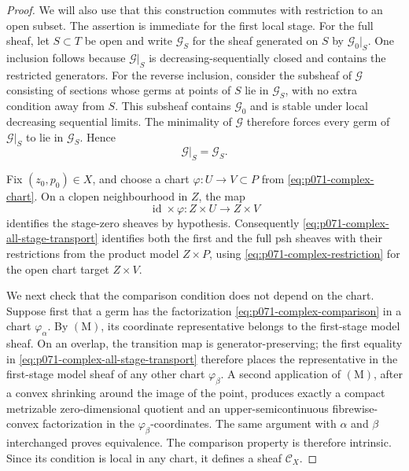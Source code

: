 \begin{proof}
We will also use that this construction commutes with restriction to an
open subset.  The assertion is immediate for the first local stage.  For
the full sheaf, let \(S\subset T\) be open and write \(\mathcal G_S\) for
the sheaf generated on \(S\) by \(\mathcal G_0|_S\).  One inclusion follows
because \(\mathcal G|_S\) is decreasing-sequentially closed and contains
the restricted generators.  For the reverse inclusion, consider the
subsheaf of \(\mathcal G\) consisting of sections whose germs at points of
\(S\) lie in \(\mathcal G_S\), with no extra condition away from \(S\).
This subsheaf contains \(\mathcal G_0\) and is stable under local decreasing
sequential limits.  The minimality of \(\mathcal G\) therefore forces every
germ of \(\mathcal G|_S\) to lie in \(\mathcal G_S\).  Hence
\begin{equation}
                    \mathcal G|_S=\mathcal G_S.
 \label{eq:p071-complex-restriction}
\end{equation}

Fix \((z_0,p_0)\in X\), and choose a chart
\(\varphi:U\to V\subset P\) from
\eqref{eq:p071-complex-chart}.  On a clopen neighbourhood in \(Z\), the map
\begin{equation}
               \operatorname{id}\times\varphi:
               Z\times U\longrightarrow Z\times V
 \label{eq:p071-complex-product-chart}
\end{equation}
identifies the stage-zero sheaves by hypothesis.  Consequently
\eqref{eq:p071-complex-all-stage-transport} identifies both the first and
the full psh sheaves with their restrictions from the product model
\(Z\times P\), using \eqref{eq:p071-complex-restriction} for the open chart
target \(Z\times V\).

We next check that the comparison condition does not depend on the chart.
Suppose first that a germ has the factorization
\eqref{eq:p071-complex-comparison} in a chart \(\varphi_\alpha\).  By
\((\mathrm M)\), its coordinate representative belongs to the first-stage
model sheaf.  On an overlap, the transition map is generator-preserving;
the first equality in \eqref{eq:p071-complex-all-stage-transport} therefore
places the representative in the first-stage model sheaf of any other
chart \(\varphi_\beta\).  A second application of \((\mathrm M)\), after a
convex shrinking around the image of the point, produces exactly a compact
metrizable zero-dimensional quotient and an upper-semicontinuous
fibrewise-convex factorization in the \(\varphi_\beta\)-coordinates.  The
same argument with \(\alpha\) and \(\beta\) interchanged proves equivalence.
The comparison property is therefore intrinsic.  Since its condition is
local in any chart, it defines a sheaf \(\mathscr C_X\).


\end{proof}
